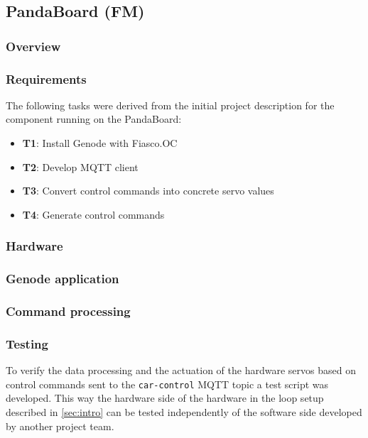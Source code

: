 \subsection{PandaBoard (FM)}
\label{sec:panda}

\subsubsection{Overview}
\label{sec:panda-overview}



\subsubsection{Requirements}
\label{sec:panda-req}
The following tasks were derived from the initial project description for the component running on the PandaBoard:
\begin{itemize}
    \item \textbf{T1}: Install Genode with Fiasco.OC
    \item \textbf{T2}: Develop MQTT client
    \item \textbf{T3}: Convert control commands into concrete servo values
    \item \textbf{T4}: Generate control commands
\end{itemize}

\subsubsection{Hardware}
\label{sec:panda-hw}

\subsubsection{Genode application}
\label{sec:panda-genode}

\subsubsection{Command processing}
\label{sec:panda-convert}

\subsubsection{Testing}
\label{sec:panda-testing}
To verify the data processing and the actuation of the hardware servos based on control commands sent to the \texttt{car-control} MQTT topic a test script was developed.
This way the hardware side of the hardware in the loop setup described in \autoref{sec:intro} can be tested independently of the software side developed by another project team.

